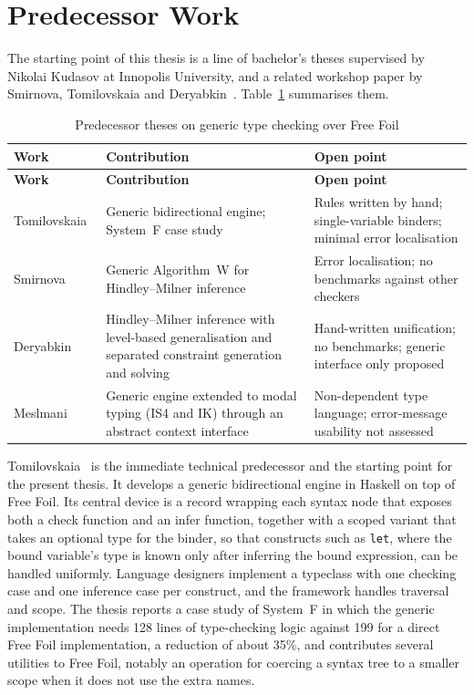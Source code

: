 \section{Predecessor Work}
\label{sec:lr-predecessors}

The starting point of this thesis is a line of bachelor's theses supervised by Nikolai Kudasov at Innopolis University, and a related workshop paper by Smirnova, Tomilovskaia and Deryabkin~\cite{kudasov2025wits}. Table~\ref{table:lr_predecessors} summarises them.

\begin{longtable}{p{3.4cm}|p{5.4cm}|p{5.0cm}}
\caption[Predecessor theses on generic type checking]{Predecessor theses on generic type checking over Free Foil} \label{table:lr_predecessors} \\
\hline
\textbf{Work} & \textbf{Contribution} & \textbf{Open point}\\
\hline
\endfirsthead
\hline
\textbf{Work} & \textbf{Contribution} & \textbf{Open point}\\
\hline
\endhead
Tomilovskaia~\cite{tomilovskaia2025bidir} & Generic bidirectional engine; System~F case study & Rules written by hand; single-variable binders; minimal error localisation\\
\hline
Smirnova~\cite{smirnova2025thesis} & Generic Algorithm~W for Hindley--Milner inference & Error localisation; no benchmarks against other checkers\\
\hline
Deryabkin~\cite{deryabkin2025hmlevels} & Hindley--Milner inference with level-based generalisation and separated constraint generation and solving & Hand-written unification; no benchmarks; generic interface only proposed\\
\hline
Meslmani~\cite{meslmani2026thesis} & Generic engine extended to modal typing (IS4 and IK) through an abstract context interface & Non-dependent type language; error-message usability not assessed\\
\hline
\end{longtable}

Tomilovskaia~\cite{tomilovskaia2025bidir} is the immediate technical predecessor and the starting point for the present thesis. It develops a generic bidirectional engine in Haskell on top of Free Foil. Its central device is a record wrapping each syntax node that exposes both a check function and an infer function, together with a scoped variant that takes an optional type for the binder, so that constructs such as \texttt{let}, where the bound variable's type is known only after inferring the bound expression, can be handled uniformly. Language designers implement a typeclass with one checking case and one inference case per construct, and the framework handles traversal and scope. The thesis reports a case study of System~F in which the generic implementation needs 128 lines of type-checking logic against 199 for a direct Free Foil implementation, a reduction of about 35\%, and contributes several utilities to Free Foil, notably an operation for coercing a syntax tree to a smaller scope when it does not use the extra names.

